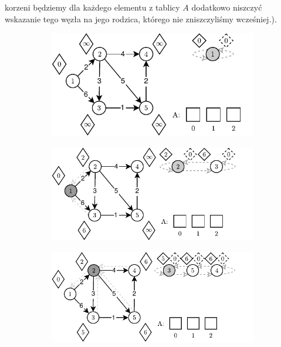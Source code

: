 korzeni będziemy dla każdego elementu z tablicy $A$ dodatkowo niszczyć wskazanie tego węzła na jego rodzica, którego nie zniszczyliśmy wcześniej.).

\begin{figure}[!htbp]
	\centering
	\begin{subfigure}[b]{0.45\textwidth}
		\includegraphics[width=\textwidth]{Chapter_II/FIBONACCI-Example/a.pdf}
		\caption{}
	\end{subfigure}%
	\begin{subfigure}[b]{0.45\textwidth}
		\includegraphics[width=\textwidth]{Chapter_II/FIBONACCI-Example/b.pdf}
		\caption{}
	\end{subfigure}
	\begin{subfigure}[b]{0.45\textwidth}
		\includegraphics[width=\textwidth]{Chapter_II/FIBONACCI-Example/c.pdf}

\end{subfigure}
\end{figure}
